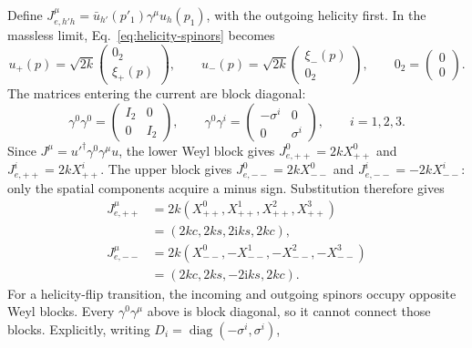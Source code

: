 \documentclass[12pt,a4paper]{article}
\numberwithin{equation}{section}
\newcommand{\ii}{\mathrm i}
\begin{document}
Define $J^\mu_{e,h'h}=\bar u_{h'}(p'_1)\gamma^\mu u_h(p_1)$, with the
outgoing helicity first. In the massless limit, Eq.~\eqref{eq:helicity-spinors}
becomes
\begin{equation}
 u_+(p)=\sqrt{2k}\begin{pmatrix}0_2\\\xi_+(p)\end{pmatrix},\qquad
 u_-(p)=\sqrt{2k}\begin{pmatrix}\xi_-(p)\\0_2\end{pmatrix},
 \qquad 0_2=\begin{pmatrix}0\\0\end{pmatrix}.
\end{equation}
The matrices entering the current are block diagonal:
\begin{equation}
 \gamma^0\gamma^0=\begin{pmatrix}I_2&0\\0&I_2\end{pmatrix},\qquad
 \gamma^0\gamma^i=\begin{pmatrix}-\sigma^i&0\\0&\sigma^i\end{pmatrix},
 \qquad i=1,2,3.
\end{equation}
Since $J^\mu=u'^\dagger\gamma^0\gamma^\mu u$, the lower Weyl block gives
$J^0_{e,++}=2kX^0_{++}$ and $J^i_{e,++}=2kX^i_{++}$. The upper block gives
$J^0_{e,--}=2kX^0_{--}$ and $J^i_{e,--}=-2kX^i_{--}$: only the spatial
components acquire a minus sign. Substitution therefore gives
\begin{equation}
\boxed{\begin{aligned}
 J^\mu_{e,++}&=2k(X^0_{++},X^1_{++},X^2_{++},X^3_{++})
 \\[-0.2em]
 &=(2kc,2ks,2\ii ks,2kc),\\[0.6em]
 J^\mu_{e,--}&=2k(X^0_{--},-X^1_{--},-X^2_{--},-X^3_{--})
 \\[-0.2em]
 &=(2kc,2ks,-2\ii ks,2kc).
\end{aligned}}
 \label{eq:electron-currents}
\end{equation}
For a helicity-flip transition, the incoming and outgoing spinors occupy
opposite Weyl blocks. Every $\gamma^0\gamma^\mu$ above is block diagonal,
so it cannot connect those blocks. Explicitly, writing
$D_i=\operatorname{diag}(-\sigma^i,\sigma^i)$,
\end{document}
